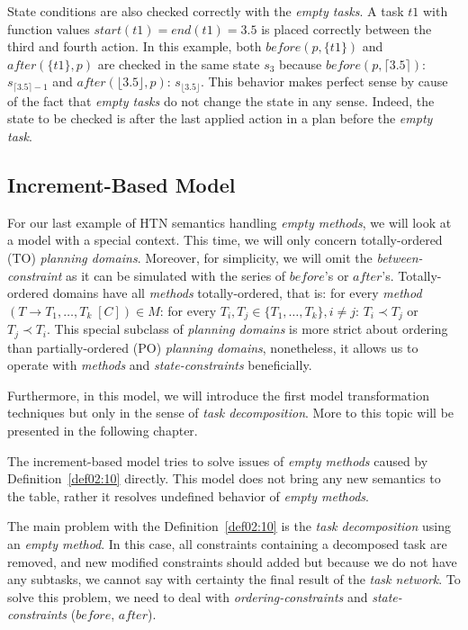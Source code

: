 \noindent
State conditions are also checked correctly with the \emph{empty tasks}. A task $t1$ with function values $start(t1) = end(t1) = 3.5$ is placed correctly between the third and fourth action. In this example, both $before(p, \{ t1 \})$ and $after(\{ t1 \}, p)$ are checked in the same state $s_3$ because $before(p, \lceil 3.5 \rceil)$: $s_{\lceil 3.5 \rceil - 1}$ and $after(\lfloor 3.5 \rfloor, p)$: $s_{\lfloor 3.5 \rfloor}$. This behavior makes perfect sense by cause of the fact that \emph{empty tasks} do not change the state in any sense. Indeed, the state to be checked is after the last applied action in a plan before the \emph{empty task}.

\subsection{Increment-Based Model}

\medskip\noindent
For our last example of HTN semantics handling \emph{empty methods}, we will look at a model with a special context. This time, we will only concern totally-ordered (TO) \emph{planning domains}. Moreover, for simplicity, we will omit the \emph{between-constraint} as it can be simulated with the series of $before$'s or $after$'s. Totally-ordered domains have all \emph{methods} totally-ordered, that is: for every \emph{method} $(T \rightarrow T_1,\dots, T_k \; [C]) \in M$: for every $T_i, T_j \in \{ T_1, \dots, T_k\}, i \neq j$: $T_i \prec T_j$ or $T_j \prec T_i$. This special subclass of \emph{planning domains} is more strict about ordering than partially-ordered (PO) \emph{planning domains}, nonetheless, it allows us to operate with \emph{methods} and \emph{state-constraints} beneficially. 

\medskip\noindent
Furthermore, in this model, we will introduce the first model transformation techniques but only in the sense of \emph{task decomposition}. More to this topic will be presented in the following chapter.

\medskip\noindent
The increment-based model tries to solve issues of \emph{empty methods} caused by Definition~\ref{def02:10} directly. This model does not bring any new semantics to the table, rather it resolves undefined behavior of \emph{empty methods}.

\medskip\noindent
The main problem with the Definition~\ref{def02:10} is the \emph{task decomposition} using an \emph{empty method}. In this case, all constraints containing a decomposed task are removed, and new modified constraints should added but because we do not have any subtasks, we cannot say with certainty the final result of the \emph{task network}. To solve this problem, we need to deal with \emph{ordering-constraints} and \emph{state-constraints} ($before$, $after$). 


